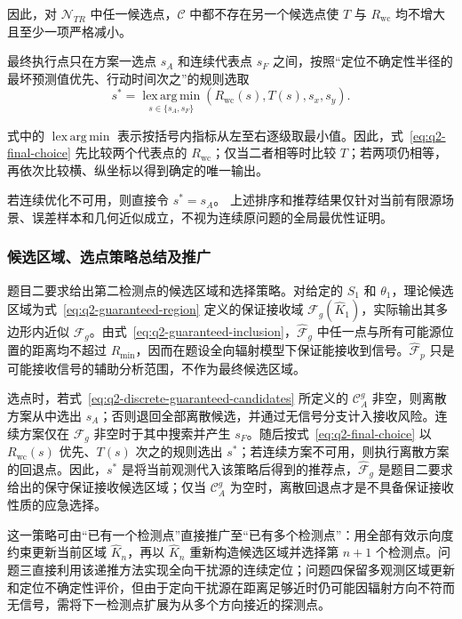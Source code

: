 \documentclass[withoutpreface,bwprint]{cumcmthesis}
\begin{document}
因此，对 $\mathcal N_{TR}$ 中任一候选点，$\mathcal C$ 中都不存在另一个候选点使 $T$ 与 $R_{\mathrm{wc}}$ 均不增大且至少一项严格减小。

最终执行点只在方案一选点 $s_A$ 和连续代表点 $s_F$ 之间，按照“定位不确定性半径的最坏预测值优先、行动时间次之”的规则选取
\begin{equation}
  s^*=\operatorname*{lex\,arg\,min}_{s\in\{s_A,s_F\}}
  \left(R_{\mathrm{wc}}(s),T(s),s_x,s_y\right).
  \label{eq:q2-final-choice}
\end{equation}

式中的 $\operatorname*{lex\,arg\,min}$ 表示按括号内指标从左至右逐级取最小值。因此，式~\eqref{eq:q2-final-choice} 先比较两个代表点的 $R_{\mathrm{wc}}$；仅当二者相等时比较 $T$；若两项仍相等，再依次比较横、纵坐标以得到确定的唯一输出。

若连续优化不可用，则直接令 $s^*=s_A$。
上述排序和推荐结果仅针对当前有限源场景、误差样本和几何近似成立，不视为连续原问题的全局最优性证明。

\subsubsection{候选区域、选点策略总结及推广}

题目二要求给出第二检测点的候选区域和选择策略。对给定的 $S_1$ 和 $\theta_1$，理论候选区域为式~\eqref{eq:q2-guaranteed-region} 定义的保证接收域 $\mathcal F_g(\widehat K_1)$，实际输出其多边形内近似 $\widehat{\mathcal F}_g$。由式~\eqref{eq:q2-guaranteed-inclusion}，$\widehat{\mathcal F}_g$ 中任一点与所有可能源位置的距离均不超过 $R_{\min}$，因而在题设全向辐射模型下保证能接收到信号。$\widehat{\mathcal F}_p$ 只是可能接收信号的辅助分析范围，不作为最终候选区域。

选点时，若式~\eqref{eq:q2-discrete-guaranteed-candidates} 所定义的 $\mathcal C_A^g$ 非空，则离散方案从中选出 $s_A$；否则退回全部离散候选，并通过无信号分支计入接收风险。连续方案仅在 $\widehat{\mathcal F}_g$ 非空时于其中搜索并产生 $s_F$。随后按式~\eqref{eq:q2-final-choice} 以 $R_{\mathrm{wc}}(s)$ 优先、$T(s)$ 次之的规则选出 $s^*$；若连续方案不可用，则执行离散方案的回退点。因此，$s^*$ 是将当前观测代入该策略后得到的推荐点，$\widehat{\mathcal F}_g$ 是题目二要求给出的保守保证接收候选区域；仅当 $\mathcal C_A^g$ 为空时，离散回退点才是不具备保证接收性质的应急选择。

这一策略可由“已有一个检测点”直接推广至“已有多个检测点”：用全部有效示向度约束更新当前区域 $\widehat K_n$，再以 $\widehat K_n$ 重新构造候选区域并选择第 $n+1$ 个检测点。问题三直接利用该递推方法实现全向干扰源的连续定位；问题四保留多观测区域更新和定位不确定性评价，但由于定向干扰源在距离足够近时仍可能因辐射方向不符而无信号，需将下一检测点扩展为从多个方向接近的探测点。
\end{document}
